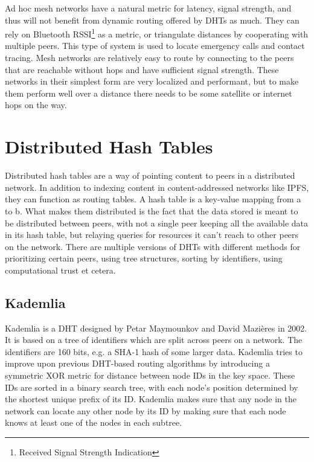 Ad hoc mesh networks have a natural metric for latency, signal strength, and thus will not benefit from dynamic routing offered by DHTs as much. They can rely on Bluetooth RSSI\footnote{Received Signal Strength Indication} as a metric, or triangulate distances by cooperating with multiple peers. This type of system is used to locate emergency calls and contact tracing.\cite{theintercept} Mesh networks are relatively easy to route by connecting to the peers that are reachable without hops and have sufficient signal strength. These networks in their simplest form are very localized and performant, but to make them perform well over a distance there needs to be some satellite or internet hops on the way. 

\section{Distributed Hash Tables}
Distributed hash tables are a way of pointing content to peers in a distributed network. In addition to indexing content in content-addressed networks like IPFS, they can function as routing tables. A hash table is a key-value mapping from a to b. What makes them distributed is the fact that the data stored is meant to be distributed between peers, with not a single peer keeping all the available data in its hash table, but relaying queries for resources it can't reach to other peers on the network. There are multiple versions of DHTs with different methods for prioritizing certain peers, using tree structures, sorting by identifiers, using computational trust et cetera. 
						
\subsection{Kademlia}
Kademlia is a DHT designed by Petar Maymounkov and David Mazières in 2002. It is based on a tree of identifiers which are split across peers on a network. The identifiers are 160 bits, e.g. a SHA-1 hash of some larger data. Kademlia tries to improve upon previous DHT-based routing algorithms by introducing a symmetric XOR metric for distance between node IDs in the key space.\cite{Petar_Maymounkov2020-sx} These IDs are sorted in a binary search tree, with each node's position determined by the shortest unique prefix of its ID. Kademlia makes sure that any node in the network can locate any other node by its ID by making sure that each node knows at least one of the nodes in each subtree.
						
